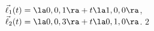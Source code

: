{$\vec\ell_1(t) = \la 0,0,1\ra + t\la 1,0,0\ra$,\\
$\vec\ell_2(t) = \la 0,0,3\ra + t\la 0,1,0\ra$.
}
{$2$
}

